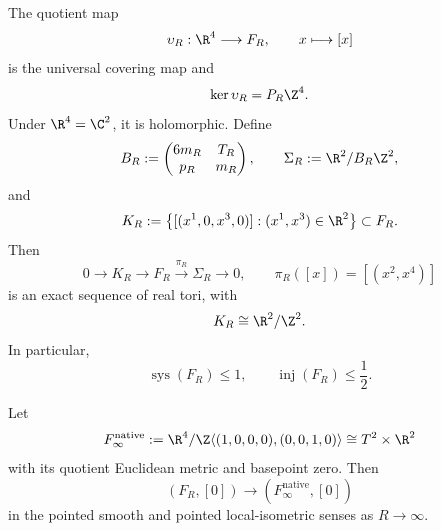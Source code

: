 \begin{proposition}
\label{prop:s6cusp-native-limit}
The quotient map
\begin{equation}\label{eq:s6cusp-universal-cover}
 \upsilon_R:\R^4\longrightarrow F_R,\qquad x\longmapsto[x]
\end{equation}
is the universal covering map and
\[
 \ker\upsilon_R=P_R\Z^4.
\]
Under \(\R^4=\C^2\), it is holomorphic.  Define
\begin{equation}\label{eq:s6cusp-BR-matrix}
 B_R:=
 \begin{pmatrix}
 6m_R&T_R\\
 p_R&m_R
 \end{pmatrix},
 \qquad
 \Sigma_R:=\R^2/B_R\Z^2,
\end{equation}
and
\begin{equation}\label{eq:s6cusp-fixed-subtorus}
 K_R:=
 \left\{[(x^1,0,x^3,0)]:
 (x^1,x^3)\in\R^2\right\}\subset F_R.
\end{equation}
Then
\begin{equation}\label{eq:s6cusp-native-exact-sequence}
 0\longrightarrow K_R
 \longrightarrow F_R
 \overset{\pi_R}{\longrightarrow}\Sigma_R
 \longrightarrow0,
 \qquad
 \pi_R([x])=[(x^2,x^4)]
\end{equation}
is an exact sequence of real tori, with
\[
 K_R\cong\R^2/\Z^2.
\]
In particular,
\begin{equation}\label{eq:s6cusp-native-systole-upper}
 \operatorname{sys}(F_R)\le1,\qquad
 \operatorname{inj}(F_R)\le\frac12.
\end{equation}

Let
\[
 F_\infty^{\mathrm{native}}
 :=
 \R^4/
 \Z\langle(1,0,0,0),(0,0,1,0)\rangle
 \cong T^2\times\R^2
\]
with its quotient Euclidean metric and basepoint zero.  Then
\begin{equation}\label{eq:s6cusp-native-pointed-limit}
 (F_R,[0])\longrightarrow
 (F_\infty^{\mathrm{native}},[0])
\end{equation}
in the pointed smooth and pointed local-isometric senses as
\(R\to\infty\).
\end{proposition}

